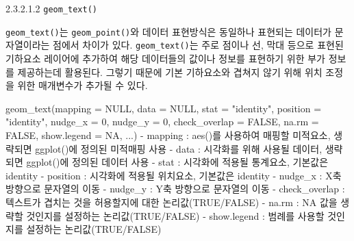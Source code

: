 \documentclass[
]{article}
\newenvironment{Shaded}{\begin{snugshade}}{\end{snugshade}}
\newcommand{\AttributeTok}[1]{\textcolor[rgb]{0.77,0.63,0.00}{#1}}
\newcommand{\ConstantTok}[1]{\textcolor[rgb]{0.00,0.00,0.00}{#1}}
\newcommand{\DecValTok}[1]{\textcolor[rgb]{0.00,0.00,0.81}{#1}}
\newcommand{\FunctionTok}[1]{\textcolor[rgb]{0.00,0.00,0.00}{#1}}
\newcommand{\NormalTok}[1]{#1}
\newcommand{\SpecialCharTok}[1]{\textcolor[rgb]{0.00,0.00,0.00}{#1}}
\newcommand{\StringTok}[1]{\textcolor[rgb]{0.31,0.60,0.02}{#1}}
\begin{document}
2.3.2.1.2 \texttt{geom\_text()}

\texttt{geom\_text()}는 \texttt{geom\_point()}와 데이터 표현방식은 동일하나 표현되는 데이터가 문자열이라는 점에서 차이가 있다. \texttt{geom\_text()}는 주로 점이나 선, 막대 등으로 표현된 기하요소 레이어에 추가하여 해당 데이터들의 값이나 정보를 표현하기 위한 부가 정보를 제공하는데 활용된다. 그렇기 때문에 기본 기하요소와 겹쳐지 않기 위해 위치 조정을 위한 매개변수가 추가될 수 있다.

\begin{Shaded}
\begin{Highlighting}[]
\FunctionTok{geom\_text}\NormalTok{(}\AttributeTok{mapping =} \ConstantTok{NULL}\NormalTok{, }\AttributeTok{data =} \ConstantTok{NULL}\NormalTok{, }\AttributeTok{stat =} \StringTok{"identity"}\NormalTok{, }\AttributeTok{position =} \StringTok{"identity"}\NormalTok{, }\AttributeTok{nudge\_x =} \DecValTok{0}\NormalTok{, }\AttributeTok{nudge\_y =} \DecValTok{0}\NormalTok{, }\AttributeTok{check\_overlap =} \ConstantTok{FALSE}\NormalTok{, }\AttributeTok{na.rm =} \ConstantTok{FALSE}\NormalTok{, }\AttributeTok{show.legend =} \ConstantTok{NA}\NormalTok{, ...)}
  \SpecialCharTok{{-}}\NormalTok{ mapping }\SpecialCharTok{:} \FunctionTok{aes}\NormalTok{()를 사용하여 매핑할 미적요소, 생략되면 }\FunctionTok{ggplot}\NormalTok{()에 정의된 미적매핑 사용}
  \SpecialCharTok{{-}}\NormalTok{ data }\SpecialCharTok{:}\NormalTok{ 시각화를 위해 사용될 데이터, 생략되면 }\FunctionTok{ggplot}\NormalTok{()에 정의된 데이터 사용}
  \SpecialCharTok{{-}}\NormalTok{ stat }\SpecialCharTok{:}\NormalTok{ 시각화에 적용될 통계요소, 기본값은 }\StringTok{\textquotesingle{}identity\textquotesingle{}}
  \SpecialCharTok{{-}}\NormalTok{ position }\SpecialCharTok{:}\NormalTok{ 시각화에 적용될 위치요소, 기본값은 }\StringTok{\textquotesingle{}identity\textquotesingle{}}
  \SpecialCharTok{{-}}\NormalTok{ nudge\_x }\SpecialCharTok{:}\NormalTok{ X축 방향으로 문자열의 이동}
  \SpecialCharTok{{-}}\NormalTok{ nudge\_y }\SpecialCharTok{:}\NormalTok{  Y축 방향으로 문자열의 이동}
  \SpecialCharTok{{-}}\NormalTok{ check\_overlap }\SpecialCharTok{:}\NormalTok{ 텍스트가 겹치는 것을 허용할지에 대한 논리값(}\ConstantTok{TRUE}\SpecialCharTok{/}\ConstantTok{FALSE}\NormalTok{)}
  \SpecialCharTok{{-}}\NormalTok{ na.rm }\SpecialCharTok{:} \ConstantTok{NA}\NormalTok{ 값을 생략할 것인지를 설정하는 논리값(}\ConstantTok{TRUE}\SpecialCharTok{/}\ConstantTok{FALSE}\NormalTok{)}
  \SpecialCharTok{{-}}\NormalTok{ show.legend }\SpecialCharTok{:}\NormalTok{ 범례를 사용할 것인지를 설정하는 논리값(}\ConstantTok{TRUE}\SpecialCharTok{/}\ConstantTok{FALSE}\NormalTok{) }
\end{Highlighting}
\end{Shaded}
\end{document}
